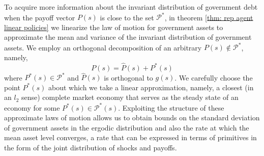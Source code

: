 \documentclass[thmsb,11pt]{article}
\begin{document}

To acquire more information about the invariant distribution of government debt when the payoff vector $P(s)$ is close to  the set $\mathcal{P}^*$, in  theorem \ref{thm: rep agent linear policies} we linearize the law of motion for  government assets to approximate %
  the mean and variance of the invariant distribution of government assets.
We employ an  orthogonal decomposition of an arbitrary $P(s) \not \in \mathcal{P}^*$, namely,
\[P(s)=\hat{P}(s)+P^*(s)\] where $P^*(s)\in \mathcal{P}^*$ and $\hat{P}(s)$ is orthogonal to $g(s)$. We carefully  choose the point
$P^*(s)$ about which we take a linear  approximation, namely,
a closest (in an $l_2$ sense) complete market economy that  serves as the steady state of an economy for  some $P^*(s)\in\mathcal{P}^*(s)$.
Exploiting the structure of these approximate laws of motion allows us to obtain bounds on the standard deviation of government  assets in the
ergodic distribution and also the rate at which the mean asset level converges, a rate  that can be expressed in terms of primitives in the form
of the joint distribution of shocks and payoffs.
\end{document}
